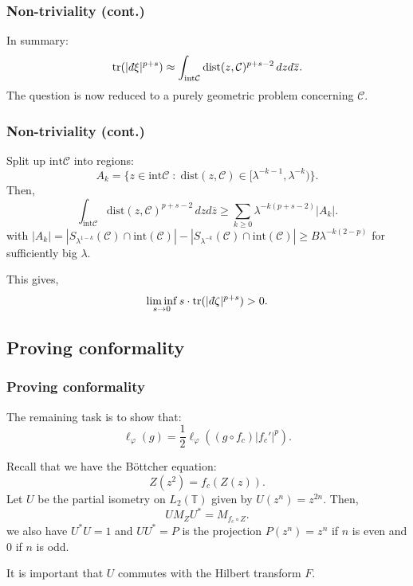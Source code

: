 \documentclass{beamer} %
\theoremstyle{definition} %
\newcommand{\Circ}{\mathbb{T}}
\newcommand{\tr}{\mathrm{tr}}
\newcommand{\dist}{\mathrm{dist}}
\def\qd{\,{\mathchar'26\mkern-12mu d}}
\begin{document}
\begin{frame}\frametitle{Non-triviality (cont.)}
    In summary:
     \begin{equation*}
         \tr(|\qd \xi|^{p+s}) \approx \int_{\mathrm{int}\mathcal{C}} \mathrm{dist}(z,\mathcal{C})^{p+s-2}\,dzd\overline{z}.
     \end{equation*}
    The question is now reduced to a purely geometric problem concerning $\mathcal{C}$.
\end{frame}

\begin{frame}\frametitle{Non-triviality (cont.)}
    Split up $\mathrm{int}\mathcal{C}$ into regions:
    \begin{equation*}
        A_k = \{z \in \mathrm{int}\mathcal{C}\;:\; \dist(z,\mathcal{C}) \in [\lambda^{-k-1},\lambda^{-k})\}.
    \end{equation*}
    Then,
    \begin{equation*}
        \int_{\mathrm{int}\mathcal{C}} \mathrm{dist}(z,\mathcal{C})^{p+s-2} \,dzd\overline{z} \geq \sum_{k\geq 0} \lambda^{-k(p+s-2)}|A_k|.
    \end{equation*}
    with $|A_k| = |S_{\lambda^{1-k}}(\mathcal{C})\cap \mathrm{int}(\mathcal{C})|-|S_{\lambda^{-k}}(\mathcal{C})\cap \mathrm{int}(\mathcal{C})| \geq B\lambda^{-k(2-p)}$
    for sufficiently big $\lambda$.
    
    This gives,
    \begin{equation*}
        \liminf_{s\to 0} s\cdot \tr(|\qd \zeta|^{p+s}) > 0.
    \end{equation*}
\end{frame}


\subsection{Proving conformality}
\begin{frame}\frametitle{Proving conformality}
    The remaining task is to show that:
    \begin{equation*}
        \ell_{\varphi}(g) = \frac{1}{2}\ell_{\varphi}((g\circ f_c)|f_c'|^p).
    \end{equation*}

    Recall that we have the B\"ottcher equation:
    \begin{equation*}
        Z(z^2) = f_c(Z(z)).
    \end{equation*} 
    Let $U$ be the partial isometry on $L_2(\Circ)$ given by $U(z^n) = z^{2n}$. Then,
    \begin{equation*}
        UM_ZU^* = M_{f_c\circ Z}.
    \end{equation*}
    we also have $U^*U = 1$ and $UU^* = P$ is the projection $P(z^n) = z^n$ if $n$ is even and $0$ if $n$ is odd.
    
    It is important that $U$ commutes with the Hilbert transform $F$.
\end{frame}
\end{document}
